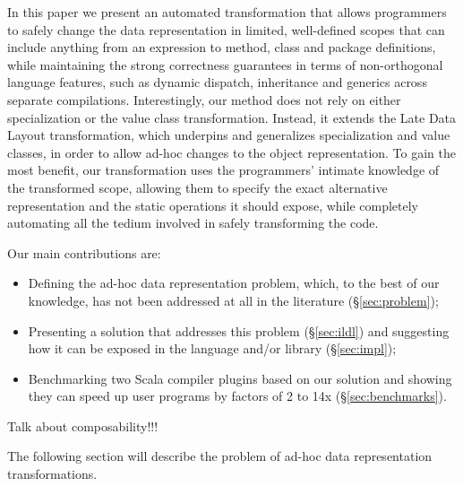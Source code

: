 In this paper we present an automated transformation that allows programmers to safely change the data representation in limited, well-defined scopes that can include anything from an expression to method, class and package definitions, while maintaining the strong correctness guarantees in terms of non-orthogonal language features, such as dynamic dispatch, inheritance and generics across separate compilations. Interestingly, our method does not rely on either specialization or the value class transformation. Instead, it extends the Late Data Layout transformation, which underpins and generalizes specialization and value classes, in order to allow ad-hoc changes to the object representation. To gain the most benefit, our transformation uses the programmers' intimate knowledge of the transformed scope, allowing them to specify the exact alternative representation and the static operations it should expose, while completely automating all the tedium involved in safely transforming the code.

Our main contributions are:
\begin{itemize}
  \item Defining the ad-hoc data representation problem, which, to the best of our knowledge, has not been addressed at all in the literature (\S\ref{sec:problem});
  \item Presenting a solution that addresses this problem (\S\ref{sec:ildl}) and suggesting how it can be exposed in the language and/or library (\S\ref{sec:impl});
  \item Benchmarking two Scala compiler plugins based on our solution and showing they can speed up user programs by factors of 2 to 14x (\S\ref{sec:benchmarks}).
\end{itemize}

Talk about composability!!!

The following section will describe the problem of ad-hoc data representation transformations.
